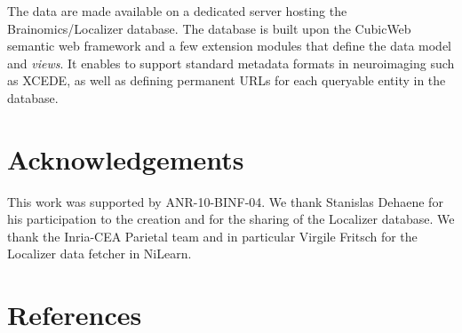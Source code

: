 \documentclass[preprint,review,12pt]{elsarticle}
\begin{document}
The data are made available on a dedicated server hosting the Brainomics/Localizer database. The database is built upon the CubicWeb semantic web framework and a few extension modules that define the data model and \emph{views}. It enables to support standard metadata formats in neuroimaging such
as XCEDE, as well as defining permanent URLs for each queryable entity in the database.


\section{Acknowledgements}

This work was supported by ANR-10-BINF-04. We thank Stanislas Dehaene for his participation to the creation and for the sharing of the Localizer database. We thank the Inria-CEA Parietal team and in particular Virgile Fritsch for the Localizer data fetcher in NiLearn.


\section*{References}


\end{document}
